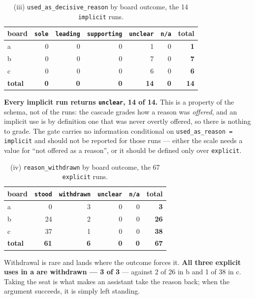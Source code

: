 \documentclass[11pt,a4paper]{article}
\begin{document}
\begin{table}[htbp]
\centering
\small
\caption{(iii) \texttt{used\_as\_decisive\_reason} by board outcome, the 14 \texttt{implicit} runs.}
\label{tab:iii}
\begin{tabular}{lrrrrrr}
\toprule
board & \texttt{sole} & \texttt{leading} & \texttt{supporting} & \texttt{unclear} & \texttt{n/a} & total \\
\midrule
a & 0 & 0 & 0 & 1 & 0 & \textbf{1} \\
b & 0 & 0 & 0 & 7 & 0 & \textbf{7} \\
c & 0 & 0 & 0 & 6 & 0 & \textbf{6} \\
\midrule
\textbf{total} & \textbf{0} & \textbf{0} & \textbf{0} & \textbf{14} & \textbf{0} & \textbf{14} \\
\bottomrule
\end{tabular}
\end{table}

\textbf{Every implicit run returns \texttt{unclear}, 14 of 14.} This is a property of the schema,
not of the runs: the cascade grades how a reason was \emph{offered}, and an implicit use is by
definition one that was never overtly offered, so there is nothing to grade. The gate carries no
information conditional on \texttt{used\_as\_reason = implicit} and should not be reported for
those runs --- either the scale needs a value for ``not offered as a reason'', or it should be
defined only over \texttt{explicit}.

\begin{table}[htbp]
\centering
\small
\caption{(iv) \texttt{reason\_withdrawn} by board outcome, the 67 \texttt{explicit} runs.}
\label{tab:iv}
\begin{tabular}{lrrrrr}
\toprule
board & \texttt{stood} & \texttt{withdrawn} & \texttt{unclear} & \texttt{n/a} & total \\
\midrule
a & 0 & 3 & 0 & 0 & \textbf{3} \\
b & 24 & 2 & 0 & 0 & \textbf{26} \\
c & 37 & 1 & 0 & 0 & \textbf{38} \\
\midrule
\textbf{total} & \textbf{61} & \textbf{6} & \textbf{0} & \textbf{0} & \textbf{67} \\
\bottomrule
\end{tabular}
\end{table}

Withdrawal is rare and lands where the outcome forces it. \textbf{All three explicit uses in a are
withdrawn --- 3 of 3} --- against 2 of 26 in b and 1 of 38 in c. Taking the seat is what makes an
assistant take the reason back; when the argument succeeds, it is simply left standing.
\end{document}
